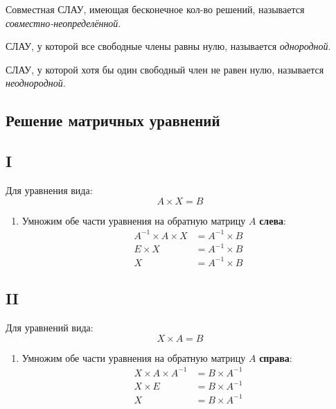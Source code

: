 \begin{definition}
  Совместная СЛАУ, имеющая бесконечное кол-во решений, называется \textit{совместно-неопределённой}.
\end{definition}

\begin{definition}
  СЛАУ, у которой все свободные члены равны нулю, называется \textit{однородной}.
\end{definition}

\begin{definition}
  СЛАУ, у которой хотя бы один свободный член не равен нулю, называется \textit{неоднородной}.
\end{definition}

\subsection{Решение матричных уравнений}

\subsection*{I}

Для уравнения вида: \[
A \times X = B
\] 
\begin{enumerate}
  \item Умножим обе части уравнения на обратную матрицу $A$ \textbf{слева}:
    \begin{align*}
      A^{-1} \times A \times X &= A^{-1} \times B \\
      E \times X &= A^{-1} \times B \\
      X &= A^{-1} \times  B
    \end{align*}
\end{enumerate}

\subsection*{II}

Для уравнений вида: \[
X \times A = B
\] 
\begin{enumerate}
  \item Умножим обе части уравнения на обратную матрицу $A$ \textbf{справа}:
    \begin{align*}
      X \times A \times A^{-1} &= B \times A^{-1} \\
      X \times E &= B \times A^{-1} \\
      X &= B \times A^{-1} \\
    \end{align*}
\end{enumerate}


